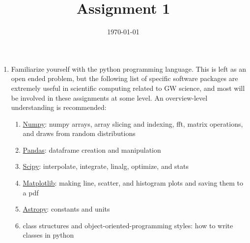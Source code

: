 \documentclass[
    aps,
    10pt,
    prd,
    notitlepage,
    onecolumn,s
    tightenlines,
    nofootinbib]{revtex4-1}
\begin{document}
\title{Assignment 1}
\begin{abstract}

\end{abstract}
\date{\today}
\maketitle

\begin{enumerate}
\item Familiarize yourself with the python programming language. This is left as an open ended problem, but the following list of specific software packages are extremely useful in scientific computing related to GW science, and most will be involved in these assignments at some level. An overview-level understanding is recommended:
\begin{enumerate}
\item \href{https://numpy.org/}{Numpy}: numpy arrays, array slicing and indexing, fft, matrix operations, and draws from random distributions
\item \href{https://pandas.pydata.org/}{Pandas}: dataframe creation and manipulation
\item \href{https://www.scipy.org/}{Scipy}: interpolate, integrate, linalg, optimize, and stats
\item \href{https://matplotlib.org/}{Matplotlib}: making line, scatter, and histogram plots and saving them to a pdf
\item \href{https://www.astropy.org/}{Astropy}: constants and units
\item class structures and object-oriented-programming styles: how to write classes in python
\end{enumerate}
\end{enumerate}
\end{document}
